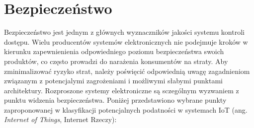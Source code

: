 	\section{Bezpieczeństwo}

		Bezpieczeństwo jest jednym z głównych wyznaczników jakości systemu kontroli dostępu. Wielu producentów systemów elektronicznych nie podejmuje kroków w kierunku zapewnienienia odpowiedniego poziomu bezpieczeństwa swoich produktów, co często prowadzi do narażenia konsumentów na straty. Aby zminimalizować ryzyko strat, należy poświęcić odpowiednią uwagę zagadnieniom związanym z potencjalymi zagrożeniami i możliwymi słabymi punktami architektury. Rozproszone systemy elektroniczne są sczególnym wyzwaniem z punktu widzenia bezpieczeństwa. Poniżej przedstawiono wybrane punkty zaproponowanej w \cite{iot-vulnerabilities} klasyfikacji potencjalnych podatności w systemach IoT (ang. \textit{Internet of Things}, Internet Rzeczy):

